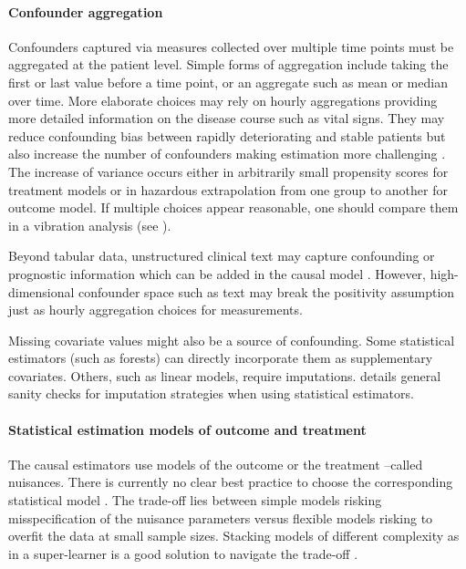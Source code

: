 \documentclass[10pt,letterpaper]{article}
\begin{document}
\paragraph{Confounder aggregation}
Confounders captured via measures collected over multiple time points must be
aggregated at the patient level. Simple forms of aggregation include taking the
first or last value before a time point, or an aggregate such as mean or median
over time. More elaborate choices may rely on hourly aggregations providing more
detailed information on the disease course such as vital signs. They may reduce
confounding bias between rapidly deteriorating and stable patients but also
increase the number of confounders making estimation more challenging
\cite{damour2020overlap}. The increase of variance occurs either in
arbitrarily small propensity scores for treatment models or in hazardous
extrapolation from one group to another for outcome model. If multiple
choices appear reasonable, one should compare them in a vibration analysis
(see ).

Beyond tabular data, unstructured clinical text may capture confounding or
prognostic information \cite{horng2017creating,jiang2023health} which can be
added in the causal model \cite{zeng2022uncovering}.
However, high-dimensional
confounder space such as text may break the positivity assumption just as hourly
aggregation choices for measurements.

Missing covariate values might also be a source of confounding. Some statistical
estimators (such as forests) can directly incorporate them as supplementary
covariates. Others, such as linear models, require imputations.
 details general sanity checks for
imputation strategies when using statistical estimators.

\paragraph{Statistical estimation models of outcome and treatment}

The causal estimators use models of the outcome or the treatment --called
nuisances. There is currently no clear best practice to choose the corresponding
statistical model \cite{wendling2018comparing, dorie2019automated}. The
trade-off lies between simple models risking misspecification of the nuisance
parameters versus flexible models risking to overfit the data at small sample
sizes. Stacking models of different complexity as in a super-learner is a good
solution to navigate the trade-off \cite{van2007super,doutreligne2023select}.
\end{document}
